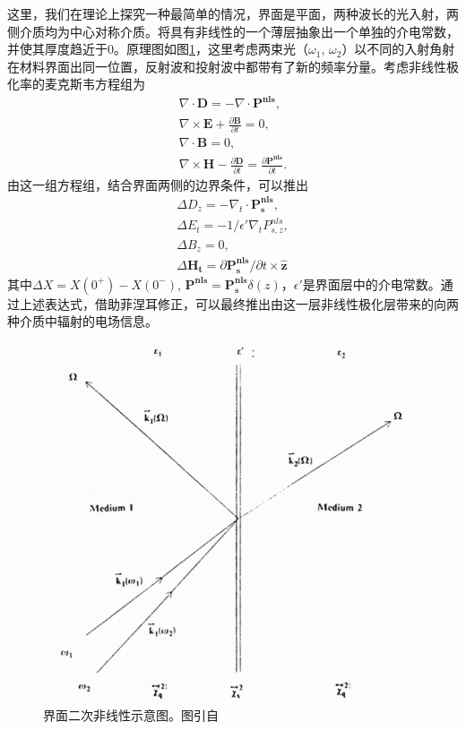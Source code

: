 \documentclass[UTF8,a4paper,cs4size,hyperref]{ctexart}
\begin{document}
这里，我们在理论上探究一种最简单的情况，界面是平面，两种波长的光入射，两侧介质均为中心对称介质。将具有非线性的一个薄层抽象出一个单独的介电常数，并使其厚度趋近于0。原理图如图\ref{pic:surface}，这里考虑两束光（$\omega_1$, $\omega_2$）以不同的入射角射在材料界面出同一位置，反射波和投射波中都带有了新的频率分量。考虑非线性极化率的麦克斯韦方程组为
\begin{gather}
\nabla \cdot \mathbf{D}  = -\nabla \cdot \mathbf{P^{nls}} , \\
\nabla \times \mathbf{E }	+ \frac{\partial\mathbf{B} }{\partial t} = 0, \\
\nabla \cdot \mathbf{B} = 0, \\
\nabla \times \mathbf{H} - \frac{\partial \mathbf{D}}{\partial t} = \frac{\partial \mathbf{P^{nls}}}{\partial t}.
\end{gather}
由这一组方程组，结合界面两侧的边界条件，可以推出\cite{heinz1991second}
\begin{gather}
\Delta D_z = -\nabla_t \cdot \mathbf{P_s^{nls}}, \\
\Delta E_t = -1/\epsilon' \nabla_t P_{s,z}^{nls}, \\
\Delta B_z = 0, \\
\Delta \mathbf{H_t} = \partial \mathbf{P_s^{nls}}/\partial t \times \mathbf{\hat z} 
\end{gather}
其中$\Delta X = X(0^+)-X(0^-)$, $\mathbf{P^{nls}}  = \mathbf{P_s^{nls}}\delta(z)$，$\epsilon'$是界面层中的介电常数。通过上述表达式，借助菲涅耳修正，可以最终推出由这一层非线性极化层带来的向两种介质中辐射的电场信息\cite{heinz1991second}。
\begin{figure}
\centering
\includegraphics[scale=1 ]{surface.png}
\caption{界面二次非线性示意图。图引自\cite{heinz1991second}}
\label{pic:surface}
\end{figure}
\end{document}
